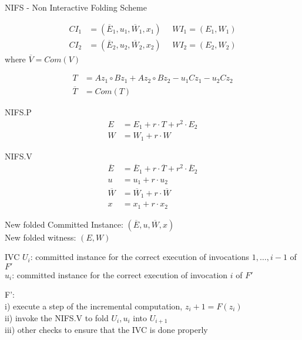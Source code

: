 \documentclass[t]{beamer}
\begin{document}
\begin{frame}{NIFS - Non Interactive Folding Scheme}
  \scriptsize{
  \begin{align*}
    CI_1 &=(\overline{E}_1, u_1, \overline{W}_1, x_1) ~~~~~~WI_1=(E_1, W_1)\\
    CI_2 &=(\overline{E}_2, u_2, \overline{W}_2, x_2) ~~~~~~WI_2=(E_2, W_2)
  \end{align*}
  where $\overline{V}=Com(V)$



  \begin{align*}
    T &= Az_1 \circ Bz_1 + Az_2 \circ Bz_2 - u_1 C z_1 - u_2 C z_2\\
    \overline{T}&=Com(T)
  \end{align*}

\begin{minipage}[t]{.45\textwidth}
  NIFS.P
  \begin{align*}
    E &= E_1 + r \cdot T + r^2 \cdot E_2\\
    W &= W_1 + r \cdot W
  \end{align*}
\end{minipage}
\hfill\vline\hfill
\begin{minipage}[t]{.45\textwidth}
  NIFS.V
  \begin{align*}
    \overline{E} &= \overline{E}_1 + r \cdot \overline{T} + r^2 \cdot \overline{E}_2\\
    u &= u_1 + r \cdot u_2\\
    \overline{W} &= \overline{W}_1 + r \cdot \overline{W}\\
    x &= x_1 + r \cdot x_2
  \end{align*}
\end{minipage}

New folded Committed Instance: $(\overline{E}, u, \overline{W}, x)$\\
New folded witness: $(E, W)$
}
\end{frame}

\begin{frame}{IVC}
  \small{
  $U_i$: committed instance for the correct execution of invocations $1, \ldots, i-1$ of $F'$\\
  $u_i$: committed instance for the correct execution of invocation $i$ of $F'$
  }


  \vspace{4cm}
  
  \small{
  F':\\
  i) execute a step of the incremental computation, $z_i+1 = F(z_i)$\\
  ii) invoke the NIFS.V to fold $U_i, u_i$ into $U_{i+1}$\\
  iii) other checks to ensure that the IVC is done properly
  }
\end{frame}
\end{document}
